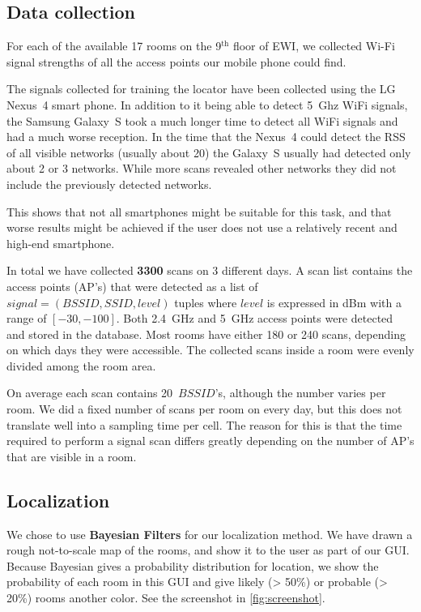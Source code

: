 \documentclass[a4paper,10pt,twoside]{IEEEtran}
\begin{document}
\subsection{Data collection}
\label{sec:loc-localization-method}
For each of the available 17 rooms on the 9$^{\text{th}}$ floor of EWI, we collected Wi-Fi signal strengths of all the access points our mobile phone could find.

The signals collected for training the locator have been collected using the LG Nexus~4 smart phone.
In addition to it being able to detect 5~Ghz WiFi signals, the Samsung Galaxy~S took a much longer time to detect all WiFi signals and had a much worse reception.
In the time that the Nexus~4 could detect the RSS of all visible networks (usually about 20) the Galaxy~S usually had detected only about 2 or 3 networks. While more scans revealed other networks they did not include the previously detected networks.
  
This shows that not all smartphones might be suitable for this task, and that worse results might be achieved if the user does not use a relatively recent and high-end smartphone.

In total we have collected \textbf{3300} scans on 3 different days.
A scan list contains the access points (AP's) that were detected as a list of $signal = (BSSID, SSID, level)$ tuples where $level$ is expressed in dBm with a range of $[-30,-100]$.
Both 2.4~GHz and 5~GHz access points were detected and stored in the database.
Most rooms have either 180 or 240 scans, depending on which days they were accessible.
The collected scans inside a room were evenly divided among the room area.

On average each scan contains 20~$BSSID$'s, although the number varies per room.
We did a fixed number of scans per room on every day, but this does not translate well into a sampling time per cell.
The reason for this is that the time required to perform a signal scan
differs greatly depending on the number of AP's that are visible in a room.

\subsection{Localization}
\label{sec:loc-data}

We chose to use \textbf{Bayesian Filters} for our localization method.
We have drawn a rough not-to-scale map of the rooms, and show it to the user as part of our GUI.
Because Bayesian gives a probability distribution for location, we show the probability of each room in this GUI and give likely (> 50\%) or probable (> 20\%) rooms another color.
See the screenshot in \autoref{fig:screenshot}.
\end{document}
